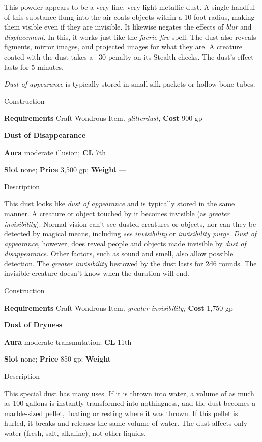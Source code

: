 This powder appears to be a very fine, very light metallic dust. A single handful of this substance flung into the air coats objects within a 10-foot radius, making them visible even if they are invisible. It likewise negates the effects of \textit{blur} and \textit{displacement}. In this, it works just like the \textit{faerie fire} spell. The dust also reveals figments, mirror images, and projected images for what they are. A creature coated with the dust takes a --30 penalty on its Stealth checks. The dust's effect lasts for 5 minutes.
				
\textit{Dust of appearance} is typically stored in small silk packets or hollow bone tubes. 
				
Construction
				
\textbf{Requirements} Craft Wondrous Item\textit{, glitterdust; }\textbf{Cost }900 gp
				
\textbf{Dust of Disappearance}
				
\textbf{Aura} moderate illusion;\textbf{ CL }7th
				
\textbf{Slot} none; \textbf{Price} 3,500 gp; \textbf{Weight }---
				
Description
				
This dust looks like \textit{dust of appearance} and is typically stored in the same manner. A creature or object touched by it becomes invisible (as \textit{greater invisibility}). Normal vision can't see dusted creatures or objects, nor can they be detected by magical means, including \textit{see invisibility} or \textit{invisibility purge}. \textit{Dust of appearance}, however, does reveal people and objects made invisible by \textit{dust of disappearance}. Other factors, such as sound and smell, also allow possible detection. The \textit{greater invisibility} bestowed by the dust lasts for 2d6 rounds. The invisible creature doesn't know when the duration will end. 
				
Construction
				
\textbf{Requirements} Craft Wondrous Item\textit{, greater invisibility;}\textbf{ Cost }1,750 gp
				
\textbf{Dust of Dryness}
				
\textbf{Aura} moderate transmutation;\textbf{ CL }11th
				
\textbf{Slot} none; \textbf{Price} 850 gp; \textbf{Weight }---
				
Description
				
This special dust has many uses. If it is thrown into water, a volume of as much as 100 gallons is instantly transformed into nothingness, and the dust becomes a marble-sized pellet, floating or resting where it was thrown. If this pellet is hurled, it breaks and releases the same volume of water. The dust affects only water (fresh, salt, alkaline), not other liquids.
				
